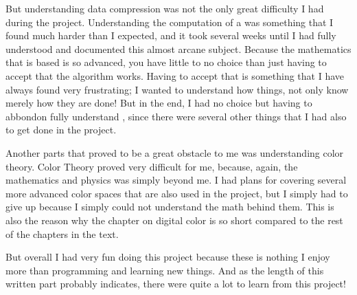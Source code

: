 But understanding data compression was not the only great difficulty I had
during the project. Understanding the computation of a \crc was
something that I found much harder than I expected, and it took
several weeks until I had fully understood and documented this almost
arcane subject. Because the mathematics that \crc is based is so
advanced, you have little to no choice than just having to accept that
the algorithm works. Having to accept that is something that I have
always found very frustrating; I wanted to understand how things, not
only know merely how they are done! But in the end, I had no choice
but having to abbondon fully understand \crc, since there were several
other things that I had also to get done in the project.

Another parts that proved to be a great obstacle to me was
understanding color theory. Color Theory proved very difficult for me,
because, again, the mathematics and physics was simply beyond me. I
had plans for covering several more advanced color spaces that are
also used in the project, but I simply had to give up because I simply
could not understand the math behind them. This is also the reason why
the chapter on digital color is so short compared to the rest of the
chapters in the text.


But overall I had very fun doing this project because these is nothing
I enjoy more than programming and learning new things. And as the
length of this written part probably indicates, there were quite a lot
to learn from this project!
